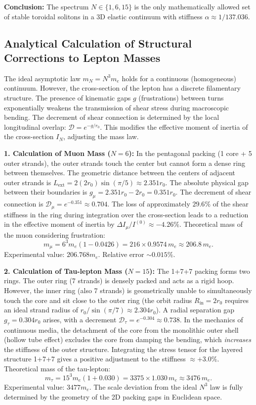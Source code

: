 \documentclass[11pt,a4paper]{article}
\begin{document}
\textbf{Conclusion:} The spectrum $N \in \{1, 6, 15\}$ is the only mathematically allowed set of stable toroidal solitons in a 3D elastic continuum with stiffness $\alpha \approx 1/137.036$.
	
\subsection{Analytical Calculation of Structural Corrections to Lepton Masses}
The ideal asymptotic law $m_N = N^3 m_e$ holds for a continuous (homogeneous) continuum. However, the cross-section of the lepton has a discrete filamentary structure. The presence of kinematic gaps $g$ (frustrations) between turns exponentially weakens the transmission of shear stress during macroscopic bending. The decrement of shear connection is determined by the local longitudinal overlap: $\mathcal{D} = e^{-g / r_0}$. This modifies the effective moment of inertia of the cross-section $I_N$, adjusting the mass law.
	
\textbf{1. Calculation of Muon Mass ($N=6$):} 
In the pentagonal packing (1 core + 5 outer strands), the outer strands touch the center but cannot form a dense ring between themselves. The geometric distance between the centers of adjacent outer strands is $L_{\text{ext}} = 2(2r_0) \sin(\pi/5) \approx 2.351 r_0$. The absolute physical gap between their boundaries is $g_\mu = 2.351 r_0 - 2 r_0 = 0.351 r_0$.
The decrement of shear connection is $\mathcal{D}_\mu = e^{-0.351} \approx 0.704$.
The loss of approximately $29.6\%$ of the shear stiffness in the ring during integration over the cross-section leads to a reduction in the effective moment of inertia by $\Delta I_\mu / I^{(0)} \approx -4.26\%$.
Theoretical mass of the muon considering frustration:
\begin{equation}
m_\mu = 6^3 m_e (1 - 0.0426) = 216 \times 0.9574 \, m_e \approx 206.8 \, m_e.
\end{equation}
Experimental value: $206.768 m_e$. Relative error $\sim 0.015\%$.
	
\textbf{2. Calculation of Tau-lepton Mass ($N=15$):}
The 1+7+7 packing forms two rings. The outer ring (7 strands) is densely packed and acts as a rigid hoop. However, the inner ring (also 7 strands) is geometrically unable to simultaneously touch the core and sit close to the outer ring (the orbit radius $R_{\text{in}} = 2r_0$ requires an ideal strand radius of $r_0 / \sin(\pi/7) \approx 2.304 r_0$). A radial separation gap $g_\tau = 0.304 r_0$ arises, with a decrement $\mathcal{D}_\tau = e^{-0.304} \approx 0.738$.
In the mechanics of continuous media, the detachment of the core from the monolithic outer shell (hollow tube effect) excludes the core from damping the bending, which \textit{increases} the stiffness of the outer structure. Integrating the stress tensor for the layered structure 1+7+7 gives a positive adjustment to the stiffness $\approx +3.0\%$.
Theoretical mass of the tau-lepton:
\begin{equation}
m_\tau = 15^3 m_e (1 + 0.030) = 3375 \times 1.030 \, m_e \approx 3476 \, m_e.
\end{equation}
Experimental value: $3477 m_e$.
The scale deviation from the ideal $N^3$ law is fully determined by the geometry of the 2D packing gaps in Euclidean space.
		
\end{document}
